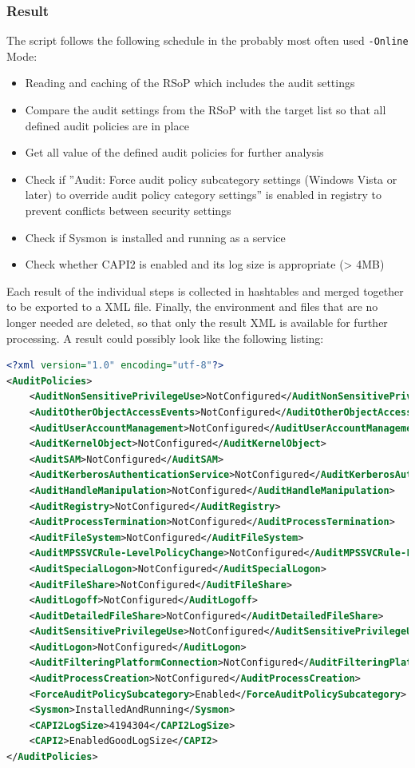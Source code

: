 \subsubsection{Result}\label{GetAndAnalyseAuditPoliciesResult}
The script follows the following schedule in the probably most often used \lstinline|-Online| Mode:
\begin{itemize}
    \item Reading and caching of the RSoP which includes the audit settings
    \item Compare the audit settings from the RSoP with the target list so that all defined audit policies are in place
    \item Get all value of the defined audit policies for further analysis
    \item Check if ''Audit: Force audit policy subcategory settings (Windows Vista or later) to override audit policy category settings'' is enabled in registry to prevent conflicts between security settings
    \item Check if Sysmon is installed and running as a service
    \item Check whether CAPI2 is enabled and its log size is appropriate (> 4MB)
\end{itemize}
Each result of the individual steps is collected in hashtables and merged together to be exported to a XML file. Finally, the environment and files that are no longer needed are deleted, so that only the result XML is available for further processing. A result could possibly look like the following listing:
\begin{lstlisting}[caption=Example Result Audit Policy Analysis, language=xml]
<?xml version="1.0" encoding="utf-8"?>
<AuditPolicies>
    <AuditNonSensitivePrivilegeUse>NotConfigured</AuditNonSensitivePrivilegeUse>
    <AuditOtherObjectAccessEvents>NotConfigured</AuditOtherObjectAccessEvents>
    <AuditUserAccountManagement>NotConfigured</AuditUserAccountManagement>
    <AuditKernelObject>NotConfigured</AuditKernelObject>
    <AuditSAM>NotConfigured</AuditSAM>
    <AuditKerberosAuthenticationService>NotConfigured</AuditKerberosAuthenticationService>
    <AuditHandleManipulation>NotConfigured</AuditHandleManipulation>
    <AuditRegistry>NotConfigured</AuditRegistry>
    <AuditProcessTermination>NotConfigured</AuditProcessTermination>
    <AuditFileSystem>NotConfigured</AuditFileSystem>
    <AuditMPSSVCRule-LevelPolicyChange>NotConfigured</AuditMPSSVCRule-LevelPolicyChange>
    <AuditSpecialLogon>NotConfigured</AuditSpecialLogon>
    <AuditFileShare>NotConfigured</AuditFileShare>
    <AuditLogoff>NotConfigured</AuditLogoff>
    <AuditDetailedFileShare>NotConfigured</AuditDetailedFileShare>
    <AuditSensitivePrivilegeUse>NotConfigured</AuditSensitivePrivilegeUse>
    <AuditLogon>NotConfigured</AuditLogon>
    <AuditFilteringPlatformConnection>NotConfigured</AuditFilteringPlatformConnection>
    <AuditProcessCreation>NotConfigured</AuditProcessCreation>
    <ForceAuditPolicySubcategory>Enabled</ForceAuditPolicySubcategory>
    <Sysmon>InstalledAndRunning</Sysmon>
    <CAPI2LogSize>4194304</CAPI2LogSize>
    <CAPI2>EnabledGoodLogSize</CAPI2>
</AuditPolicies>
\end{lstlisting}

